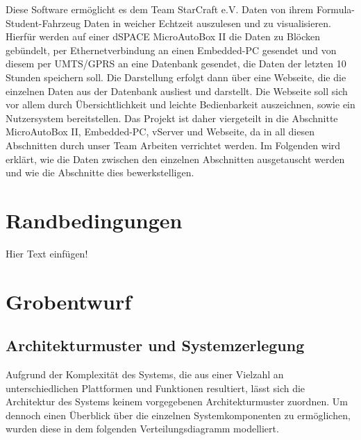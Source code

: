 \documentclass[fontsize = 12pt, paper = a4]{scrreprt}
\begin{document}
Diese Software ermöglicht es dem Team StarCraft e.V. Daten von ihrem Formula-Student-Fahrzeug Daten in weicher Echtzeit auszulesen und zu visualisieren. Hierfür werden auf einer dSPACE MicroAutoBox II die Daten zu Blöcken gebündelt, per Ethernetverbindung an einen Embedded-PC gesendet und von diesem per UMTS/GPRS an eine Datenbank gesendet, die Daten der letzten 10 Stunden speichern soll. Die Darstellung erfolgt dann über eine Webseite, die die einzelnen Daten aus der Datenbank ausliest und darstellt. Die Webseite soll sich vor allem durch Übersichtlichkeit und leichte Bedienbarkeit auszeichnen, sowie ein Nutzersystem bereitstellen. Das Projekt ist daher viergeteilt in die Abschnitte MicroAutoBox II, Embedded-PC, vServer und Webseite, da in all diesen Abschnitten durch unser Team Arbeiten verrichtet werden. Im Folgenden wird erklärt, wie die Daten zwischen den einzelnen Abschnitten ausgetauscht werden und wie die Abschnitte dies bewerkstelligen.



\chapter{Randbedingungen} 

Hier Text einfügen!


\chapter{Grobentwurf}

\section{Architekturmuster und Systemzerlegung}

Aufgrund der Komplexität des Systems, die aus einer Vielzahl an unterschiedlichen Plattformen und Funktionen resultiert, lässt sich die Architektur des Systems keinem vorgegebenen Architekturmuster zuordnen. Um dennoch einen Überblick über die einzelnen Systemkomponenten zu ermöglichen, wurden diese in dem folgenden Verteilungsdiagramm modelliert.
\end{document}
